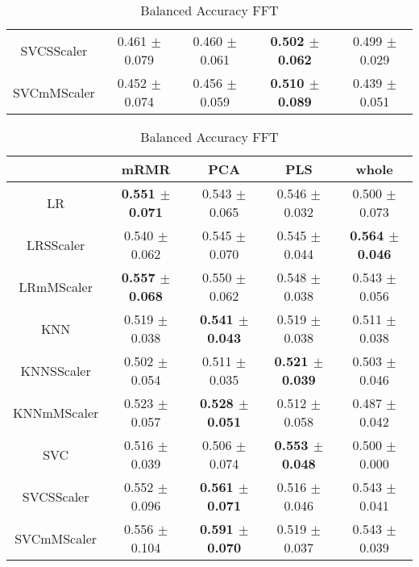 \documentclass[]{report}
\begin{document}
\begin{table}
\begin{tabular}{c|cccc}
			 SVCSScaler  & 0.461 $\pm$ 0.079 & 0.460 $\pm$ 0.061 & \textbf{0.502 $\pm$ 0.062} & 0.499 $\pm$ 0.029 \\
			 SVCmMScaler & 0.452 $\pm$ 0.074 & 0.456 $\pm$ 0.059 & \textbf{0.510 $\pm$ 0.089} & 0.439 $\pm$ 0.051 \\
			\hline
		\end{tabular}
		\caption{\label{tab:bal_acc_DCOR} Balanced Accuracy DCOR}
		\vspace*{2cm}
		\begin{tabular}{c|cccc}
			\hline
			             & mRMR            & PCA             & PLS             & whole           \\
			\hline
			 LR          & \textbf{0.551 $\pm$ 0.071} & 0.543 $\pm$ 0.065 & 0.546 $\pm$ 0.032 & 0.500 $\pm$ 0.073 \\
			 LRSScaler   & 0.540 $\pm$ 0.062 & 0.545 $\pm$ 0.070 & 0.545 $\pm$ 0.044 & \textbf{0.564 $\pm$ 0.046} \\
			 LRmMScaler  & \textbf{0.557 $\pm$ 0.068} & 0.550 $\pm$ 0.062 & 0.548 $\pm$ 0.038 & 0.543 $\pm$ 0.056 \\
			 KNN         & 0.519 $\pm$ 0.038 & \textbf{0.541 $\pm$ 0.043} & 0.519 $\pm$ 0.038 & 0.511 $\pm$ 0.038 \\
			 KNNSScaler  & 0.502 $\pm$ 0.054 & 0.511 $\pm$ 0.035 & \textbf{0.521 $\pm$ 0.039} & 0.503 $\pm$ 0.046 \\
			 KNNmMScaler & 0.523 $\pm$ 0.057 & \textbf{0.528 $\pm$ 0.051} & 0.512 $\pm$ 0.058 & 0.487 $\pm$ 0.042 \\
			 SVC         & 0.516 $\pm$ 0.039 & 0.506 $\pm$ 0.074 & \textbf{0.553 $\pm$ 0.048} & 0.500 $\pm$ 0.000 \\
			 SVCSScaler  & 0.552 $\pm$ 0.096 & \textbf{0.561 $\pm$ 0.071} & 0.516 $\pm$ 0.046 & 0.543 $\pm$ 0.041 \\
			 SVCmMScaler & 0.556 $\pm$ 0.104 & \textbf{0.591 $\pm$ 0.070} & 0.519 $\pm$ 0.037 & 0.543 $\pm$ 0.039 \\
			\hline
		\end{tabular}
		\caption{\label{tab:bal_acc_FFT} Balanced Accuracy FFT}
		\vspace*{2cm}
	\end{table}
\end{document}
